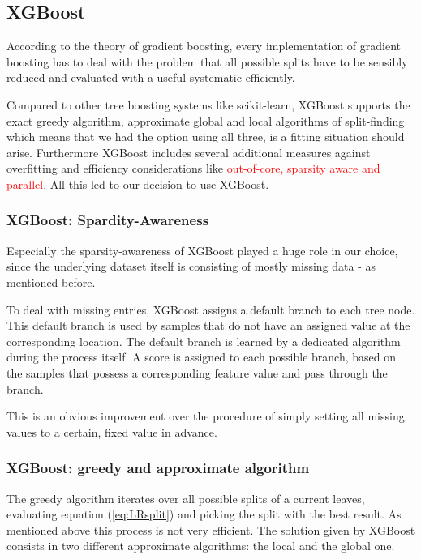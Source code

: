 \subsection{XGBoost}\label{subsec:xgb}

According to the theory of gradient boosting, every implementation of gradient boosting has to deal with the problem that all possible splits have to be sensibly reduced and evaluated with a useful systematic  efficiently.

Compared to other tree boosting systems like scikit-learn, XGBoost supports the exact greedy algorithm, approximate global and local algorithms of split-finding which means that we had the option using all three, is a fitting situation should arise. Furthermore XGBoost includes several additional measures against overfitting and efficiency considerations like \textcolor{red}{out-of-core, sparsity aware and parallel}.  All this led to our decision to use XGBoost.

\subsubsection{XGBoost: Spardity-Awareness}

Especially the sparsity-awareness of XGBoost played a huge role in our choice, since the underlying dataset itself is consisting of mostly missing data - as mentioned before.

To deal with missing entries, XGBoost assigns a default branch to each tree node. This default branch is used by samples that do not have an assigned value at the corresponding location. The default branch is learned by a dedicated algorithm during the process itself. A score is assigned to each possible branch, based on the samples that possess a corresponding feature value and pass through the branch.

This is an obvious improvement over the procedure of simply setting all missing values to a certain, fixed value in advance.

\subsubsection{XGBoost: greedy and approximate algorithm}
The greedy algorithm iterates over all possible splits of a current leaves, evaluating equation (\ref{eq:LRsplit}) and picking the split with the best result. As mentioned above this process is not very efficient. The solution given by XGBoost consists in two different approximate algorithms: the local and the global one.

